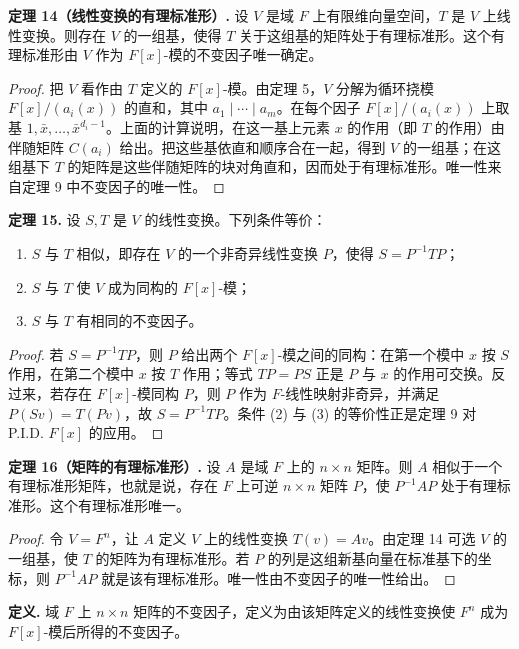 \noindent\textbf{定理 14（线性变换的有理标准形）.} 设 $V$ 是域 $F$ 上有限维向量空间，$T$ 是 $V$ 上线性变换。则存在 $V$ 的一组基，使得 $T$ 关于这组基的矩阵处于有理标准形。这个有理标准形由 $V$ 作为 $F[x]$-模的不变因子唯一确定。

\begin{proof}
把 $V$ 看作由 $T$ 定义的 $F[x]$-模。由定理 5，$V$ 分解为循环挠模 $F[x]/(a_i(x))$ 的直和，其中 $a_1\mid\cdots\mid a_m$。在每个因子 $F[x]/(a_i(x))$ 上取基 $1,\bar x,\ldots,\bar x^{d_i-1}$。上面的计算说明，在这一基上元素 $x$ 的作用（即 $T$ 的作用）由伴随矩阵 $C(a_i)$ 给出。把这些基依直和顺序合在一起，得到 $V$ 的一组基；在这组基下 $T$ 的矩阵是这些伴随矩阵的块对角直和，因而处于有理标准形。唯一性来自定理 9 中不变因子的唯一性。
\end{proof}

\noindent\textbf{定理 15.} 设 $S,T$ 是 $V$ 的线性变换。下列条件等价：
\begin{enumerate}[label=(\arabic*)]
\item $S$ 与 $T$ 相似，即存在 $V$ 的一个非奇异线性变换 $P$，使得 $S=P^{-1}TP$；
\item $S$ 与 $T$ 使 $V$ 成为同构的 $F[x]$-模；
\item $S$ 与 $T$ 有相同的不变因子。
\end{enumerate}

\begin{proof}
若 $S=P^{-1}TP$，则 $P$ 给出两个 $F[x]$-模之间的同构：在第一个模中 $x$ 按 $S$ 作用，在第二个模中 $x$ 按 $T$ 作用；等式 $TP=PS$ 正是 $P$ 与 $x$ 的作用可交换。反过来，若存在 $F[x]$-模同构 $P$，则 $P$ 作为 $F$-线性映射非奇异，并满足 $P(Sv)=T(Pv)$，故 $S=P^{-1}TP$。条件 (2) 与 (3) 的等价性正是定理 9 对 P.I.D. $F[x]$ 的应用。
\end{proof}

\noindent\textbf{定理 16（矩阵的有理标准形）.} 设 $A$ 是域 $F$ 上的 $n\times n$ 矩阵。则 $A$ 相似于一个有理标准形矩阵，也就是说，存在 $F$ 上可逆 $n\times n$ 矩阵 $P$，使 $P^{-1}AP$ 处于有理标准形。这个有理标准形唯一。

\begin{proof}
令 $V=F^n$，让 $A$ 定义 $V$ 上的线性变换 $T(v)=Av$。由定理 14 可选 $V$ 的一组基，使 $T$ 的矩阵为有理标准形。若 $P$ 的列是这组新基向量在标准基下的坐标，则 $P^{-1}AP$ 就是该有理标准形。唯一性由不变因子的唯一性给出。
\end{proof}

\noindent\textbf{定义.} 域 $F$ 上 $n\times n$ 矩阵的不变因子，定义为由该矩阵定义的线性变换使 $F^n$ 成为 $F[x]$-模后所得的不变因子。

